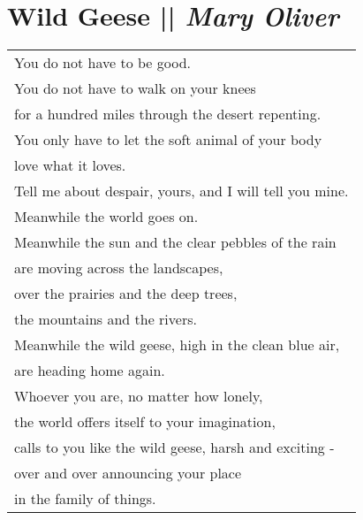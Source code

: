 \section[Wild Geese]{Wild Geese || \emph{Mary Oliver} \hspace*{\fill}  \thepage}
\label{sec:Wild_Geese.tex}
\hspace{0pt}
\vfill
\begin{center}
\begin{tabular}{l}
You do not have to be good.\\
You do not have to walk on your knees\\
for a hundred miles through the desert repenting.\\
You only have to let the soft animal of your body\\
love what it loves.\\
Tell me about despair, yours, and I will tell you mine.\\
Meanwhile the world goes on.\\
Meanwhile the sun and the clear pebbles of the rain\\
are moving across the landscapes,\\
over the prairies and the deep trees,\\
the mountains and the rivers.\\
Meanwhile the wild geese, high in the clean blue air,\\
are heading home again.\\
Whoever you are, no matter how lonely,\\
the world offers itself to your imagination,\\
calls to you like the wild geese, harsh and exciting -\\
over and over announcing your place\\
in the family of things.\\
\end{tabular}
\end{center}
\vfill
\hspace{0pt}